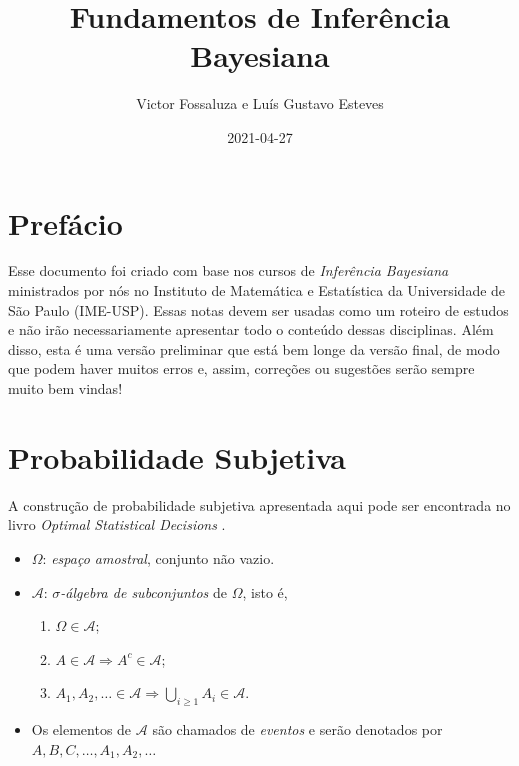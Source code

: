 \documentclass[
]{book}
\title{Fundamentos de Inferência Bayesiana}
\author{Victor Fossaluza e Luís Gustavo Esteves}
\date{2021-04-27}
\providecommand{\tightlist}{%
  \setlength{\itemsep}{0pt}\setlength{\parskip}{0pt}}
\begin{document}
\maketitle

{
\setcounter{tocdepth}{1}
\tableofcontents
}
\hypertarget{prefuxe1cio}{%
\chapter{Prefácio}\label{prefuxe1cio}}

Esse documento foi criado com base nos cursos de \emph{Inferência Bayesiana} ministrados por nós no Instituto de Matemática e Estatística da Universidade de São Paulo (IME-USP). Essas notas devem ser usadas como um roteiro de estudos e não irão necessariamente apresentar todo o conteúdo dessas disciplinas. Além disso, esta é uma versão preliminar que está bem longe da versão final, de modo que podem haver muitos erros e, assim, correções ou sugestões serão sempre muito bem vindas!

\hypertarget{ProbSubj}{%
\chapter{Probabilidade Subjetiva}\label{ProbSubj}}

A construção de probabilidade subjetiva apresentada aqui pode ser encontrada no livro \emph{Optimal Statistical Decisions} \citep{DeGroot70}.

\begin{itemize}
\item
  \(\Omega\): \emph{espaço amostral}, conjunto não vazio.
\item
  \(\mathcal{A}\): \emph{\(\sigma\)-álgebra de subconjuntos} de \(\Omega\), isto é,

  \begin{enumerate}
  \def\labelenumi{\arabic{enumi}.}
  \tightlist
  \item
    \(\Omega \in \mathcal{A}\);
  \item
    \(A \in \mathcal{A} \Longrightarrow A^{c} \in \mathcal{A}\);
  \item
    \(\displaystyle A_1, A_2, \ldots \in \mathcal{A} \Longrightarrow \bigcup_{i\geq1} A_i \in \mathcal{A}\).
  \end{enumerate}
\item
  Os elementos de \(\mathcal{A}\) são chamados de \emph{eventos} e serão denotados por \(A, B, C, \ldots, A_1, A_2, \ldots\)
\end{itemize}
\end{document}
